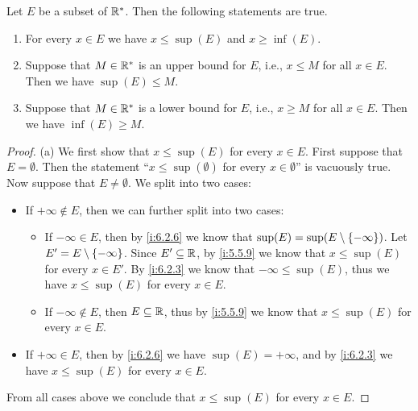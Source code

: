 \begin{thm}\label{i:6.2.11}
  Let \(E\) be a subset of \(\mathbb{R}^*\).
  Then the following statements are true.
  \begin{enumerate}
    \item For every \(x \in E\) we have \(x \leq \sup(E)\) and \(x \geq \inf(E)\).
    \item Suppose that \(M \in \mathbb{R}^*\) is an upper bound for \(E\), i.e., \(x \leq M\) for all \(x \in E\).
          Then we have \(\sup(E) \leq M\).
    \item Suppose that \(M \in \mathbb{R}^*\) is a lower bound for \(E\), i.e., \(x \geq M\) for all \(x \in E\).
          Then we have \(\inf(E) \geq M\).
  \end{enumerate}
\end{thm}

\begin{proof}{(a)}
  We first show that \(x \leq \sup(E)\) for every \(x \in E\).
  First suppose that \(E = \emptyset\).
  Then the statement ``\(x \leq \sup(\emptyset)\) for every \(x \in \emptyset\)'' is vacuously true.
  Now suppose that \(E \neq \emptyset\).
  We split into two cases:
  \begin{itemize}
    \item If \(+\infty \not\in E\), then we can further split into two cases:
          \begin{itemize}
            \item If \(-\infty \in E\), then by \cref{i:6.2.6} we know that \(\sup(E) = \sup(E \setminus \left\lbrace-\infty\right\rbrace)\).
                  Let \(E' = E \setminus \left\lbrace-\infty\right\rbrace\).
                  Since \(E' \subseteq \mathbb{R}\), by \cref{i:5.5.9} we know that \(x \leq \sup(E)\) for every \(x \in E'\).
                  By \cref{i:6.2.3} we know that \(-\infty \leq \sup(E)\), thus we have \(x \leq \sup(E)\) for every \(x \in E\).
            \item If \(-\infty \notin E\), then \(E \subseteq \mathbb{R}\), thus by \cref{i:5.5.9} we know that \(x \leq \sup(E)\) for every \(x \in E\).
          \end{itemize}
    \item If \(+\infty \in E\), then by \cref{i:6.2.6} we have \(\sup(E) = +\infty\), and by \cref{i:6.2.3} we have \(x \leq \sup(E)\) for every \(x \in E\).
  \end{itemize}
  From all cases above we conclude that \(x \leq \sup(E)\) for every \(x \in E\).


\end{proof}
